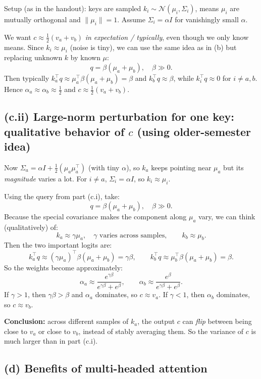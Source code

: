 \documentclass[11pt]{article}
\begin{document}
Setup (as in the handout): keys are sampled $k_i\sim \mathcal N(\mu_i,\Sigma_i)$, means $\mu_i$ are mutually orthogonal and $\|\mu_i\|=1$. Assume $\Sigma_i=\alpha I$ for vanishingly small $\alpha$.

We want $c\approx \frac12(v_a+v_b)$ \emph{in expectation / typically}, even though we only know means. Since $k_i\approx \mu_i$ (noise is tiny), we can use the same idea as in (b) but replacing unknown $k$ by known $\mu$:
\[
q=\beta(\mu_a+\mu_b),\quad \beta\gg 0.
\]
Then typically $k_a^\top q \approx \mu_a^\top \beta(\mu_a+\mu_b)=\beta$ and $k_b^\top q \approx \beta$, while $k_i^\top q\approx 0$ for $i\neq a,b$. Hence $\alpha_a\approx\alpha_b\approx \tfrac12$ and $c\approx \tfrac12(v_a+v_b)$.

\subsection*{(c.ii) Large-norm perturbation for one key: qualitative behavior of $c$ (using older-semester idea)}

Now $\Sigma_a=\alpha I+\tfrac12(\mu_a\mu_a^\top)$ (with tiny $\alpha$), so $k_a$ keeps pointing near $\mu_a$ but its \emph{magnitude} varies a lot. For $i\neq a$, $\Sigma_i=\alpha I$, so $k_i\approx \mu_i$.

Using the query from part (c.i), take:
\[
q=\beta(\mu_a+\mu_b), \quad \beta\gg 0.
\]
Because the special covariance makes the component along $\mu_a$ vary, we can think (qualitatively) of:
\[
k_a \approx \gamma \mu_a,\quad \gamma \text{ varies across samples},
\qquad
k_b\approx \mu_b.
\]
Then the two important logits are:
\[
k_a^\top q \approx (\gamma\mu_a)^\top \beta(\mu_a+\mu_b)=\gamma\beta,
\qquad
k_b^\top q \approx \mu_b^\top \beta(\mu_a+\mu_b)=\beta.
\]
So the weights become approximately:
\[
\alpha_a \approx \frac{e^{\gamma\beta}}{e^{\gamma\beta}+e^\beta},
\qquad
\alpha_b \approx \frac{e^\beta}{e^{\gamma\beta}+e^\beta}.
\]
If $\gamma>1$, then $\gamma\beta>\beta$ and $\alpha_a$ dominates, so $c\approx v_a$.
If $\gamma<1$, then $\alpha_b$ dominates, so $c\approx v_b$.

\textbf{Conclusion:} across different samples of $k_a$, the output $c$ can \emph{flip} between being close to $v_a$ or close to $v_b$, instead of stably averaging them. So the variance of $c$ is much larger than in part (c.i).

\subsection*{(d) Benefits of multi-headed attention}
\end{document}
